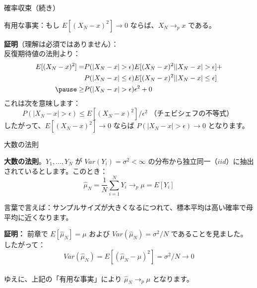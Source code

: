\documentclass[11pt,handout]{beamer}
\newenvironment{wideitemize}{\itemize\addtolength{\itemsep}{10pt}}{\enditemize}
\begin{document}
\begin{frame}{確率収束（続き）}
	
\begin{wideitemize}

\item 有用な事実：もし $E[ (X_N - x)^2 ] \rightarrow 0$ ならば、$X_N \rightarrow_p x$ である。

\pause

\item 
\textbf{証明}（理解は必須ではありません）：\\

反復期待値の法則より：
\begin{align*}
E[ (X_N - x)^2 ]=& P( |X_N - x| > \epsilon ) E[ (X_N - x)^2 | |X_N - x| > \epsilon ] + \\
& P( |X_N - x| \leq \epsilon ) E[ (X_N - x)^2 | |X_N - x| \leq \epsilon ]	 \\
\pause \geq &  P( |X_N - x| > \epsilon ) \epsilon^2 + 0 
\end{align*}
\pause
\noindent これは次を意味します：
$$P( |X_N - x|  > \epsilon ) \leq E[ (X_N - x)^2  ] / \epsilon^2 \text{ （チェビシェフの不等式） }$$
\pause 
したがって、$E[ (X_N - x)^2  ] \rightarrow 0$ ならば $P( |X_N - x|  > \epsilon ) \rightarrow 0$ となります。

\end{wideitemize}	
\end{frame}

\begin{frame}{大数の法則}
	
\begin{wideitemize}
	
\item \textbf{大数の法則}。$Y_1,...,Y_N$ が $Var(Y_i) = \sigma^2 < \infty$ の分布から独立同一（$iid$）に抽出されているとします。このとき：
$$\hat\mu_N = \frac{1}{N} \sum_{i=1}^{N} Y_i \rightarrow_p \mu = E[Y_i]$$

\item
言葉で言えば：サンプルサイズが大きくなるにつれて、標本平均は高い確率で母平均に近くなります。

\pause
\item
\textbf{証明：} 前章で $E[\hat\mu_N] = \mu$ および $Var(\hat\mu_N) = \sigma^2 / N$ であることを見ました。 \\

したがって：
$$Var(\hat\mu_N) = E[ (\hat\mu_N - \mu )^2 ] = \sigma^2/N \rightarrow 0 $$ \\

ゆえに、上記の「有用な事実」により $\hat\mu_N \rightarrow_p \mu$ となります。
\end{wideitemize}	
	
\end{frame}
\end{document}
